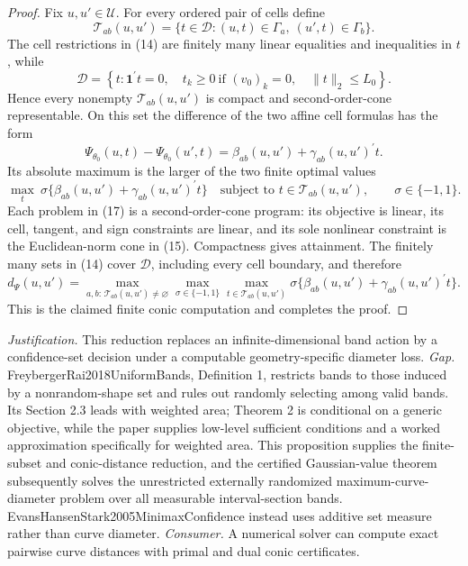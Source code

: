 \documentclass{article}
\begin{document}
\begin{proof}
Fix \(u,u'\in\mathcal U\).  For every ordered pair of cells define
\[
 \mathcal T_{ab}(u,u')
 =\{t\in\mathcal D:(u,t)\in\Gamma_a,\ (u',t)\in\Gamma_b\}.
\tag{14}
\]
The cell restrictions in (14) are finitely many linear equalities and inequalities in \(t\), while
\[
 \mathcal D=\left\{t:\mathbf 1^{\prime}t=0,\quad
 t_k\geq0\ \text{if }(v_0)_k=0,\quad
 \lVert t\rVert_2\leq L_0\right\}.
\tag{15}
\]
Hence every nonempty \(\mathcal T_{ab}(u,u')\) is compact and second-order-cone representable.  On this set the difference of the two affine cell formulas has the form
\[
 \Psi_{\theta_0}(u,t)-\Psi_{\theta_0}(u',t)
 =\beta_{ab}(u,u')+\gamma_{ab}(u,u')^{\prime}t.
\tag{16}
\]
Its absolute maximum is the larger of the two finite optimal values
\[
 \max_{t}\ \sigma\{\beta_{ab}(u,u')+\gamma_{ab}(u,u')^{\prime}t\}
 \quad\text{subject to }t\in\mathcal T_{ab}(u,u'),
 \qquad \sigma\in\{-1,1\}.
\tag{17}
\]
Each problem in (17) is a second-order-cone program: its objective is linear, its cell, tangent, and sign constraints are linear, and its sole nonlinear constraint is the Euclidean-norm cone in (15).  Compactness gives attainment.  The finitely many sets in (14) cover \(\mathcal D\), including every cell boundary, and therefore
\[
 d_\Psi(u,u')
 =\max_{a,b:\,\mathcal T_{ab}(u,u')\ne\varnothing}
   \max_{\sigma\in\{-1,1\}}
   \max_{t\in\mathcal T_{ab}(u,u')}
   \sigma\{\beta_{ab}(u,u')+\gamma_{ab}(u,u')^{\prime}t\}.
\tag{18}
\]
This is the claimed finite conic computation and completes the proof.
\end{proof}
\par\smallskip\noindent \textit{Justification.} This reduction replaces an infinite-dimensional band action by a confidence-set decision under a computable geometry-specific diameter loss. \textit{Gap.} FreybergerRai2018UniformBands, Definition 1, restricts bands to those induced by a nonrandom-shape set and rules out randomly selecting among valid bands. Its Section 2.3 leads with weighted area; Theorem 2 is conditional on a generic objective, while the paper supplies low-level sufficient conditions and a worked approximation specifically for weighted area. This proposition supplies the finite-subset and conic-distance reduction, and the certified Gaussian-value theorem subsequently solves the unrestricted externally randomized maximum-curve-diameter problem over all measurable interval-section bands. EvansHansenStark2005MinimaxConfidence instead uses additive set measure rather than curve diameter. \textit{Consumer.} A numerical solver can compute exact pairwise curve distances with primal and dual conic certificates.
\end{document}
